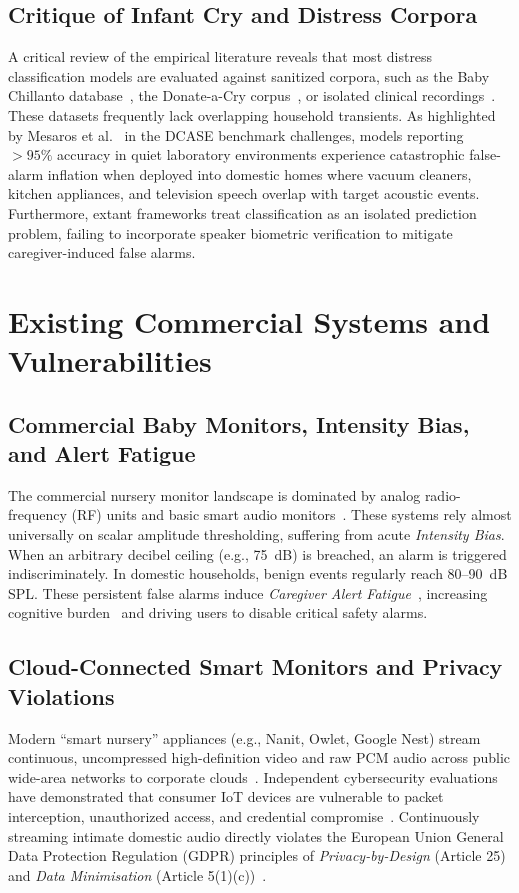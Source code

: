 \documentclass[12pt, a4paper]{report}
\begin{document}
\subsection{Critique of Infant Cry and Distress Corpora}
A critical review of the empirical literature reveals that most distress classification models are evaluated against sanitized corpora, such as the Baby Chillanto database~\cite{ref_reyes2008}, the Donate-a-Cry corpus~\cite{ref_donateacry2015}, or isolated clinical recordings~\cite{ref_ji2021}. These datasets frequently lack overlapping household transients. As highlighted by Mesaros et al.~\cite{ref_mesaros2018} in the DCASE benchmark challenges, models reporting $> 95\%$ accuracy in quiet laboratory environments experience catastrophic false-alarm inflation when deployed into domestic homes where vacuum cleaners, kitchen appliances, and television speech overlap with target acoustic events. Furthermore, extant frameworks treat classification as an isolated prediction problem, failing to incorporate speaker biometric verification to mitigate caregiver-induced false alarms.

\section{Existing Commercial Systems and Vulnerabilities}

\subsection{Commercial Baby Monitors, Intensity Bias, and Alert Fatigue}
The commercial nursery monitor landscape is dominated by analog radio-frequency (RF) units and basic smart audio monitors~\cite{ref_asplund2020}. These systems rely almost universally on scalar amplitude thresholding, suffering from acute \textit{Intensity Bias}. When an arbitrary decibel ceiling (e.g., 75~dB) is breached, an alarm is triggered indiscriminately. In domestic households, benign events regularly reach 80--90~dB SPL. These persistent false alarms induce \textit{Caregiver Alert Fatigue}~\cite{ref_sendelbach2013}, increasing cognitive burden~\cite{ref_juttner2025} and driving users to disable critical safety alarms.

\subsection{Cloud-Connected Smart Monitors and Privacy Violations}
Modern ``smart nursery'' appliances (e.g., Nanit, Owlet, Google Nest) stream continuous, uncompressed high-definition video and raw PCM audio across public wide-area networks to corporate clouds~\cite{ref_alrawi2019}. Independent cybersecurity evaluations have demonstrated that consumer IoT devices are vulnerable to packet interception, unauthorized access, and credential compromise~\cite{ref_fernandes2016}. Continuously streaming intimate domestic audio directly violates the European Union General Data Protection Regulation (GDPR) principles of \textit{Privacy-by-Design} (Article 25) and \textit{Data Minimisation} (Article 5(1)(c))~\cite{ref_voigt2017}.
\end{document}
